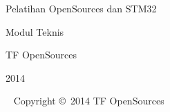 \documentclass[11pt,fleqn]{book} %
\begin{document}
\begingroup
\thispagestyle{empty}
  \begin{center}
  \end{center}
  \centering
  \vspace*{9cm}
  \par\normalfont\fontsize{35}{35}\sffamily\selectfont
  Pelatihan OpenSources dan STM32\par %
  \vspace*{1cm}
  {\Huge Modul Teknis}\par %
  \vspace*{1cm}
  {\large TF OpenSources}\par
  {\large 2014}\par
\endgroup
% 
\newpage
~\vfill
\thispagestyle{empty}
\noindent Copyright \copyright\ 2014 TF OpenSources\\ %
\end{document}
